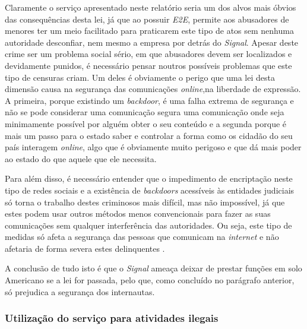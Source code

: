 Claramente o serviço apresentado neste relatório seria um dos alvos mais óbvios das consequências desta lei, já que ao possuir \textit{E2E}, permite aos abusadores de menores ter um meio facilitado para praticarem este tipo de atos sem nenhuma autoridade desconfiar, nem mesmo a empresa por detrás do \textit{Signal}. Apesar deste crime ser um problema social sério, em que abusadores devem ser localizados e devidamente punidos, é necessário pensar noutros possíveis problemas que este tipo de censuras criam. Um deles é obviamente o perigo que uma lei desta dimensão causa na segurança das comunicações \textit{online},na liberdade de expressão. A primeira, porque existindo um \textit{backdoor}, é uma falha extrema de segurança e não se pode considerar uma comunicação segura uma comunicação onde seja minimamente possível por alguém obter o seu conteúdo e a segunda porque é mais um passo para o estado saber e controlar a forma como os cidadão do seu país interagem \textit{online}, algo que é obviamente muito perigoso e que dá mais poder ao estado do que aquele que ele necessita.

Para além disso, é necessário entender que o impedimento de encriptação neste tipo de redes sociais e a existência de \textit{backdoors} acessíveis às entidades judiciais só torna o trabalho destes criminosos mais difícil, mas não impossível, já que estes podem usar outros métodos menos convencionais para fazer as suas comunicações sem qualquer interferência das autoridades. Ou seja, este tipo de medidas só afeta a segurança das pessoas que comunicam na \textit{internet} e não afetaria de forma severa estes delinquentes \cite{sigan_blog_earn_it}.

A conclusão de tudo isto é que o \textit{Signal} ameaça deixar de prestar funções em solo Americano se a lei for passada, pelo que, como concluído no parágrafo anterior, só prejudica a segurança dos internautas.

\subsubsection{Utilização do serviço para atividades ilegais}

